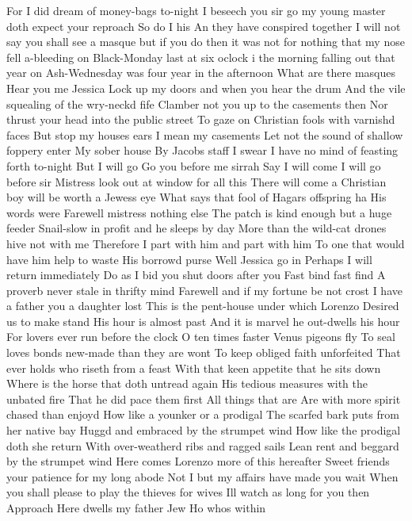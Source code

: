 For I did dream of money-bags to-night 
I beseech you sir go my young master doth expect 
your reproach 
So do I his 
An they have conspired together I will not say you 
shall see a masque but if you do then it was not 
for nothing that my nose fell a-bleeding on 
Black-Monday last at six oclock i the morning 
falling out that year on Ash-Wednesday was four 
year in the afternoon 
What are there masques Hear you me Jessica 
Lock up my doors and when you hear the drum 
And the vile squealing of the wry-neckd fife 
Clamber not you up to the casements then 
Nor thrust your head into the public street 
To gaze on Christian fools with varnishd faces 
But stop my houses ears I mean my casements 
Let not the sound of shallow foppery enter 
My sober house By Jacobs staff I swear 
I have no mind of feasting forth to-night 
But I will go Go you before me sirrah 
Say I will come 
I will go before sir Mistress look out at 
window for all this There will come a Christian 
boy will be worth a Jewess eye 
What says that fool of Hagars offspring ha 
His words were Farewell mistress nothing else 
The patch is kind enough but a huge feeder 
Snail-slow in profit and he sleeps by day 
More than the wild-cat drones hive not with me 
Therefore I part with him and part with him 
To one that would have him help to waste 
His borrowd purse Well Jessica go in 
Perhaps I will return immediately 
Do as I bid you shut doors after you 
Fast bind fast find 
A proverb never stale in thrifty mind 
Farewell and if my fortune be not crost 
I have a father you a daughter lost 
This is the pent-house under which Lorenzo 
Desired us to make stand 
His hour is almost past 
And it is marvel he out-dwells his hour 
For lovers ever run before the clock 
O ten times faster Venus pigeons fly 
To seal loves bonds new-made than they are wont 
To keep obliged faith unforfeited 
That ever holds who riseth from a feast 
With that keen appetite that he sits down 
Where is the horse that doth untread again 
His tedious measures with the unbated fire 
That he did pace them first All things that are 
Are with more spirit chased than enjoyd 
How like a younker or a prodigal 
The scarfed bark puts from her native bay 
Huggd and embraced by the strumpet wind 
How like the prodigal doth she return 
With over-weatherd ribs and ragged sails 
Lean rent and beggard by the strumpet wind 
Here comes Lorenzo more of this hereafter 
Sweet friends your patience for my long abode 
Not I but my affairs have made you wait 
When you shall please to play the thieves for wives 
Ill watch as long for you then Approach 
Here dwells my father Jew Ho whos within 
